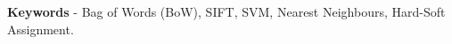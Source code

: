 
\begin{abstract}

\end{abstract}


{\footnotesize \noindent\textbf{Keywords} - Bag of Words (BoW), SIFT, SVM, Nearest Neighbours, Hard-Soft Assignment}.
